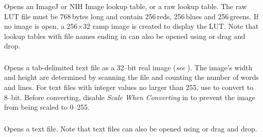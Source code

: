 Opens an ImageJ or NIH Image lookup table, or a raw lookup table.
The raw LUT file must be 768\,bytes long and contain
256\,reds, 256\,blues and 256\,greens. If no image is open, a 256$\times$32
ramp image is created to display the LUT. Note that lookup tables
with file names ending in  can also be opened using
 or drag and
drop.


\subsubsection[\protect\userinterface{Text Image\ldots{}}]{\protect{}\label{sub:Import>Text-Image}\improvement{}}

Opens a tab-delimited text file as a 32--bit real image (\emph{see}
). The image's width and height are determined
by scanning the file and counting the number of words and lines. For
text files with integer values no larger than 255, use 
to convert to 8--bit. Before converting, disable \emph{Scale When
Converting} in 
to prevent the image from being scaled to 0--255.




\subsubsection{\protect{}\label{sub:Import>Text-File} }

Opens a text file. Note that text files can also be opened using 
or drag and drop.


\subsubsection[\protect\userinterface{URL\ldots{}}]{\protect{}\label{sub:Import>URL}\improvement{}}

